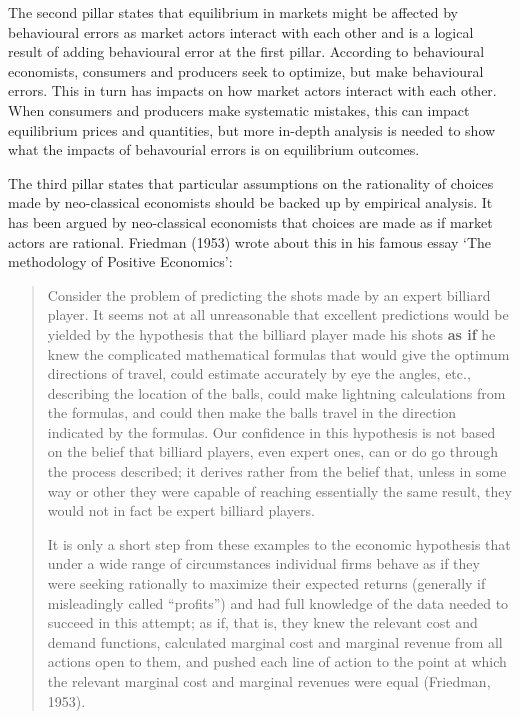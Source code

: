 \documentclass[
]{book}
\begin{document}
The second pillar states that equilibrium in markets might be affected by behavioural errors as market actors interact with each other and is a logical result of adding behavioural error at the first pillar. According to behavioural economists, consumers and producers seek to optimize, but make behavioural errors. This in turn has impacts on how market actors interact with each other. When consumers and producers make systematic mistakes, this can impact equilibrium prices and quantities, but more in-depth analysis is needed to show what the impacts of behavourial errors is on equilibrium outcomes.

The third pillar states that particular assumptions on the rationality of choices made by neo-classical economists should be backed up by empirical analysis. It has been argued by neo-classical economists that choices are made as if market actors are rational. Friedman (1953) wrote about this in his famous essay `The methodology of Positive Economics':

\begin{quote}
Consider the problem of predicting the shots made by an expert billiard player. It seems not at all unreasonable that excellent predictions would be yielded by the hypothesis that the billiard player made his shots \textbf{as if} he knew the complicated mathematical formulas that would give the optimum directions of travel, could estimate accurately by eye the angles, etc., describing the location of the balls, could make lightning calculations from the formulas, and could then make the balls travel in the direction indicated by the formulas. Our confidence in this hypothesis is not based on the belief that billiard players, even expert ones, can or do go through the process described; it derives rather from the belief that, unless in some way or other they were capable of reaching essentially the same result, they would not in fact be expert billiard players.

It is only a short step from these examples to the economic hypothesis that under a wide range of circumstances individual firms behave as if they were seeking rationally to maximize their expected returns (generally if misleadingly called ``profits'') and had full knowledge of the data needed to succeed in this attempt; as if, that is, they knew the relevant cost and demand functions, calculated marginal cost and marginal revenue from all actions open to them, and pushed each line of action to the point at which the relevant marginal cost and marginal revenues were equal (Friedman, 1953).
\end{quote}
\end{document}
